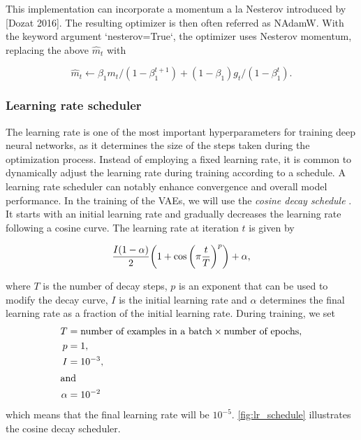 This implementation can incorporate a momentum a la Nesterov introduced by [Dozat 2016]. The resulting optimizer is then often referred as NAdamW. With the keyword argument `nesterov=True`, the optimizer uses Nesterov momentum, replacing the above $\hat{m}_t$ with

 \begin{equation*}
    \hat{m}_t \leftarrow
    \beta_1 m_t / {(1-\beta_1^{t+1})} + (1 - \beta_1) g_t / {(1-\beta_1^t)}. 
 \end{equation*}


\subsubsection{Learning rate scheduler}

The learning rate is one of the most important hyperparameters for training deep neural networks, as it determines the size of the steps taken during the optimization process. Instead of employing a fixed learning rate, it is common to dynamically adjust the learning rate during training according to a schedule. A learning rate scheduler can notably enhance convergence and overall model performance. In the training of the VAEs, we will use the \textit{cosine decay schedule} \citep{cosine_decay}. It starts with an initial learning rate and gradually decreases the learning rate following a cosine curve. The learning rate at iteration $t$ is given by

\begin{equation}\label{eq:cosine_decay}
    \frac{I \qty(1 - \alpha)}{2} \qty(1 + \cos \qty(\pi \frac{t}{T})^p) + \alpha,
\end{equation}

where $T$ is the number of decay steps, $p$ is an exponent that can be used to modify the decay curve, $I$ is the initial learning rate and $\alpha$ determines the final learning rate as a fraction of the initial learning rate. During training, we set 
\begin{align*}
    T &= \text{number of examples in a batch} \times \text{number of epochs}, \\
    p &= 1, \\
    I &= 10^{-3}, \\
    \intertext{and}
    \alpha &= 10^{-2}
\end{align*}
which means that the final learning rate will be $10^{-5}$. \autoref{fig:lr_schedule} illustrates the cosine decay scheduler.

